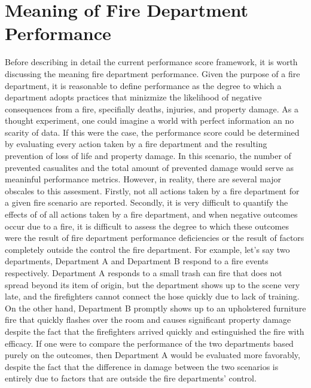 \documentclass[12pt,oneside]{book}
\begin{document}
\section{Meaning of Fire Department Performance}
Before describing in detail the current performance score framework, it is worth discussing the meaning fire department performance. Given the purpose of a fire department, it is reasonable to define performance as the degree to which a department adopts practices that minizmize the likelihood of negative consequences from a fire, specifially deaths, injuries, and property damage. As a thought experiment, one could imagine a world with perfect information an no scarity of data. If this were the case, the performance score could be determined by evaluating every action taken by a fire department and the resulting prevention of loss of life and property damage. In this scenario, the number of prevented casualites and the total amount of prevented damage would serve as meaninful performance metrics. However, in reality, there are several major obscales to this assesment. Firstly, not all actions taken by a fire department for a given fire scenario are reported. Secondly, it is very difficult to quantify the effects of of all actions taken by a fire department, and when negative outcomes occur due to a fire, it is difficult to assess the degree to which these outcomes were the result of fire department performance deficiencies or the result of factors completely outside the control the fire department. For example, let's say two departments, Department A and Department B respond to a fire events respectively. Department A responds to a small trash can fire that does not spread beyond its item of origin, but the department shows up to the scene very late, and the firefighters cannot connect the hose quickly due to lack of training. On the other hand, Department B promptly shows up to an upholstered furniture fire that quickly flashes over the room and causes significant property damage despite the fact that the firefighters arrived quickly and estinguished the fire with efficacy. If one were to compare the performance of the two departments based purely on the outcomes, then Department A would be evaluated more favorably, despite the fact that the difference in damage between the two scenarios is entirely due to factors that are outside the fire departments' control. 
\end{document}
